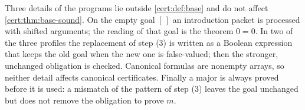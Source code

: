\begin{remark}\label{cert:rem:base-details}
Three details of the programs lie outside \cref{cert:def:base} and do not
affect \cref{cert:thm:base-sound}. On the empty goal $[\,]$ an introduction
packet is processed with shifted arguments; the reading of that goal is the
theorem $0=0$. In two of the three profiles the replacement of step (3) is
written as a Boolean expression that keeps the old goal when the new one is
false-valued; then the stronger, unchanged obligation is checked. Canonical
formulas are nonempty arrays, so neither detail affects canonical
certificates. Finally a major is always proved before it is used: a mismatch
of the pattern of step (3) leaves the goal unchanged but does not remove the
obligation to prove $m$.
\end{remark}

